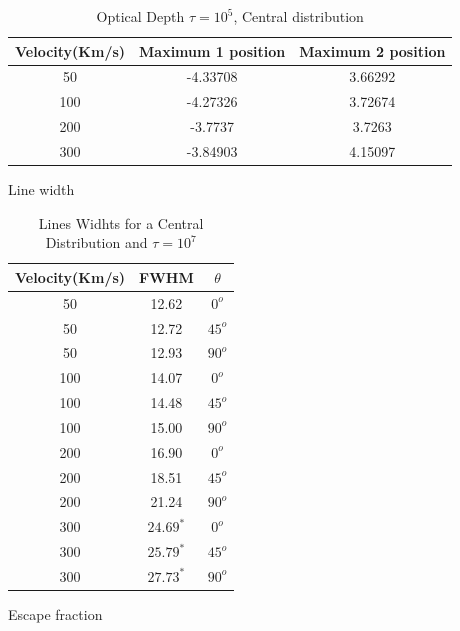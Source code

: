 \documentclass[usenatbib]{mn2e}
\begin{document}
\begin{table}
\begin{center}
\begin{tabular}{ccc}\hline 
Velocity(Km/s) & Maximum 1 position & Maximum 2 position\\ \hline
50 & -4.33708 & 3.66292 \\ 
100 & -4.27326 & 3.72674 \\ 
200 & -3.7737 & 3.7263   \\ 
300 & -3.84903 & 4.15097 \\ \hline 
\end{tabular}
\caption{Optical Depth $\tau=10^{5}$, Central distribution} 
\end{center}
\end{table}

Line width\\

\begin{table}
\begin{center}
\begin{tabular}{ccc}\hline 
Velocity(Km/s) & FWHM & $\theta$\\ \hline 
50 & 12.62 & $0^{o}$ \\ 
50 & 12.72 & $45^{o}$ \\ 
50 & 12.93 & $90^{o}$ \\ 
100 & 14.07 & $0^{o}$ \\ 
100 & 14.48 & $45^{o}$ \\ 
100 & 15.00 & $90^{o}$ \\ 
200 & 16.90 & $0^{o}$  \\ 
200 & 18.51 & $45^{o}$ \\ 
200 & 21.24 & $90^{o}$ \\ 
300 & $24.69^{*}$ & $0^{o}$ \\ 
300 & $25.79^{*}$ & $45^{o}$  \\ 
300 & $27.73^{*}$ & $90^{o}$ \\ \hline
\end{tabular}
\caption{Lines Widhts for a Central Distribution and $\tau=10^{7}$} 
\end{center}
\end{table}


Escape fraction\\
\end{document}
